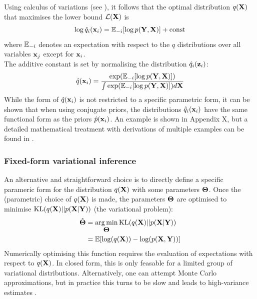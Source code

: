 Using calculus of variations (see \cite{Bishop,Murphy}), it follows that the optimal distribution $q({\bf X})$ that maximises the lower bound $\mathcal{L}({\bf X})$ is
\begin{equation} \label{eq:optimal}
	\log \hat{q}_i({\bf x}_i) = \mathbb{E}_{-i} [\log p({\bf Y},{\bf X})] + \mathrm{const}
\end{equation}
where $\mathbb{E}_{-i}$ denotes an expectation with respect to the $q$ distributions over all variables ${\bf x}_j$ except for ${\bf x}_i$.\\
The additive constant is set by normalising the distribution $\hat{q}_i({\bf z}_i)$:
\[
	\hat{q}({\bf x}_i) = \frac{\exp(\mathbb{E}_{-i}[\log p({\bf Y},{\bf X})])}{\int \exp(\mathbb{E}_{-i}[\log p({\bf Y},{\bf X})]) d{\bf X}}
\]
While the form of $\hat{q}({\bf x}_i)$ is not restricted to a specific parametric form, it can be shown that when using conjugate priors, the distributions $\hat{q}_i({\bf x}_i)$ have the same functional form as the priors $\hat{p}({\bf x}_i)$. An example is shown in Appendix X, but a detailed mathematical treatment with derivations of multiple examples can be found in \cite{Bishop,Murphy,Zhao2009}.


\subsubsection{Fixed-form variational inference}  \label{section:fixed_form}
An alternative and straightforward choice is to directly define a specific parameric form for the distribution $q({\bf X})$ with some parameters $\mbox{\boldmath $\Theta$}$. Once the (parametric) choice of $q({\bf X})$ is made, the parameters $\mbox{\boldmath $\Theta$}$ are optimised to minimise ${\rm KL}(q({\bf X})||p({\bf X}|{\bf Y}))$ (the variational problem):
\begin{align}
	\hat{\mbox{\boldmath $\Theta$}} &= \operatorname*{arg\,min}_{\mbox{\boldmath $\Theta$}} {\rm KL}(q({\bf X})||p({\bf X}|{\bf Y})) \\
	&= \mathbb{E}[\log(q({\bf X})) - \log(p({\bf X},{\bf Y}))]
\end{align}
Numerically optimising this function requires the evaluation of expectations with respect to $q({\bf X})$. In closed form, this is only feasable for a limited group of variational distributions. Alternatively, one can attempt Monte Carlo approximations, but in practice this turns to be slow and leads to high-variance estimates \cite{Braun2007,Ranganath2014,Braun2007}.

